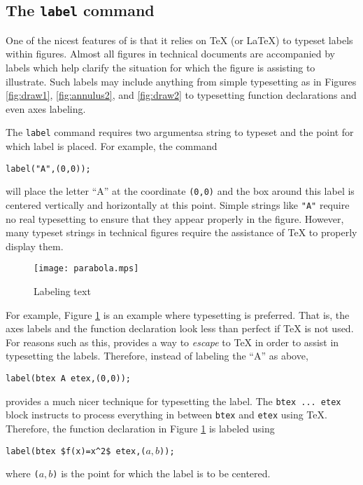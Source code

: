 \subsection{The \texttt{label} command}

One of the nicest features of \MP{} is that it relies on \TeX{} (or
\LaTeX) to typeset labels within figures.  Almost all figures in
technical documents are accompanied by labels which help clarify the
situation for which the figure is assisting to illustrate.  Such labels
may include anything from simple typesetting as in Figures
\ref{fig:draw1}, \ref{fig:annulus2}, and \ref{fig:draw2} to typesetting
function declarations and even axes labeling.

The \texttt{label} command requires two arguments\Dash a string to
typeset and the point for which label is placed.  For example, the
command

\begin{center}
  \verb|label("A",(0,0));|
\end{center}
will place the letter ``A'' at the coordinate \texttt{(0,0)} and the box
around this label is centered vertically and horizontally at this point.
Simple strings like \texttt{"A"} require no real typesetting to ensure
that they appear properly in the figure.  However, many typeset strings
in technical figures require the assistance of \TeX{} to properly
display them.

\begin{figure}
  \centering
  \texttt{[image: parabola.mps]}
  \caption{Labeling text}
  \label{fig:parabola}
\end{figure}

For example, Figure \ref{fig:parabola} is an example where typesetting
is preferred.  That is, the axes labels and the function declaration
look less than perfect if \TeX{} is not used.  For reasons such as this,
\MP{} provides a way to \textit{escape} to \TeX{} in order to assist in
typesetting the labels.  Therefore, instead of labeling the ``A'' as
above,

\begin{center}
  \verb|label(btex A etex,(0,0));|
\end{center}
provides a much nicer technique for typesetting the label.  The
\texttt{btex\,...\,etex} block instructs \MP{} to process everything in
between \texttt{btex} and \texttt{etex} using \TeX.  Therefore, the
function declaration in Figure \ref{fig:parabola} is labeled using

\begin{center}
  \verb|label(btex $f(x)=x^2$ etex,(|$a,b$\verb|));|
\end{center}
where \verb|(|$a,b$\verb|)| is the point for which the label is to be
centered.


